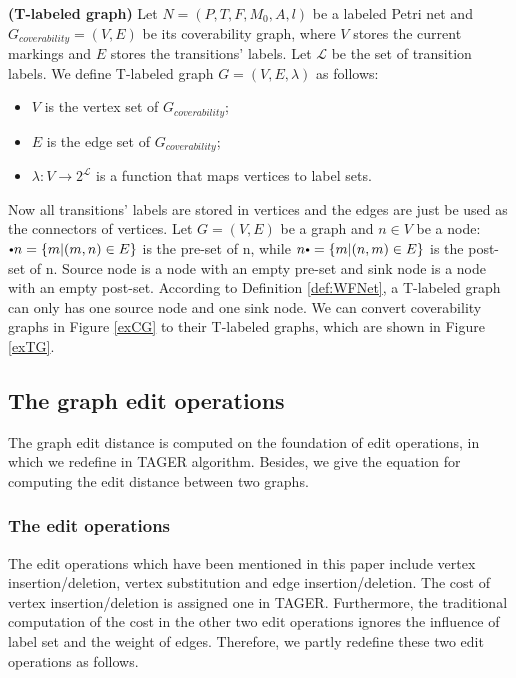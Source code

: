 \documentclass{llncs}
\begin{document}
\begin{definition}\textbf{(T-labeled graph)}\label{def:tg}
Let $N=(P,T,F,M_{0},A,l)$ be a labeled Petri net and $G_{coverability}=(V,E)$ be its coverability graph, where $V$ stores the current markings and $E$ stores the transitions' labels. Let $\mathcal{L}$ be the set of transition labels. We define T-labeled graph $G=(V,E,\lambda)$ as follows:
\begin{itemize}
\item $V$ is the vertex set of $G_{coverability}$;
\item $E$ is the edge set of $G_{coverability}$;
\item $\lambda:V \rightarrow 2^{\mathcal{L}}$ is a function that maps vertices to label sets.
\end{itemize}
\end{definition}
Now all transitions' labels are stored in vertices and the edges are just be used as the connectors of vertices. Let $G = (V,E)$ be a graph and $n \in V$ be a node: $\vcenter{\hbox{\tiny$\bullet$}} n = \{m|(m, n) \in E\}$ is the pre-set of n, while $n\vcenter{\hbox{\tiny$\bullet$}} = \{m|(n, m) \in E\}$ is the post-set of n. Source node is a node with an empty pre-set and sink node is a node with an empty post-set. According to Definition \ref{def:WFNet}, a T-labeled graph can only has one source node and one sink node.
We can convert coverability graphs in Figure \ref{exCG}  to their T-labeled graphs, which are shown in Figure \ref{exTG}.

\subsection{The graph edit operations}\label{GraphEditOperation}

The graph edit distance is computed on the foundation of edit operations, in which we redefine in TAGER algorithm. Besides, we give the equation for computing the edit distance between two graphs.
\subsubsection{The edit operations}
The edit operations which have been mentioned in this paper include vertex insertion/deletion, vertex substitution and edge insertion/deletion. The cost of vertex insertion/deletion is assigned one in TAGER. Furthermore, the traditional computation of the cost in the other two edit operations ignores the influence of label set and the weight of edges. Therefore, we partly redefine these two edit operations as follows.
\end{document}
